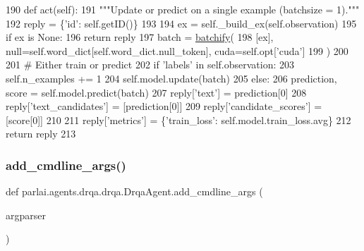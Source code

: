 \begin{DoxyCode}
190     \textcolor{keyword}{def }act(self):
191         \textcolor{stringliteral}{"""Update or predict on a single example (batchsize = 1)."""}
192         reply = \{\textcolor{stringliteral}{'id'}: self.getID()\}
193 
194         ex = self.\_build\_ex(self.observation)
195         \textcolor{keywordflow}{if} ex \textcolor{keywordflow}{is} \textcolor{keywordtype}{None}:
196             \textcolor{keywordflow}{return} reply
197         batch = \hyperlink{namespaceparlai_1_1agents_1_1drqa_1_1utils_aca22dd97c5b6dcda2a7479c1cb22ef1e}{batchify}(
198             [ex], null=self.word\_dict[self.word\_dict.null\_token], cuda=self.opt[\textcolor{stringliteral}{'cuda'}]
199         )
200 
201         \textcolor{comment}{# Either train or predict}
202         \textcolor{keywordflow}{if} \textcolor{stringliteral}{'labels'} \textcolor{keywordflow}{in} self.observation:
203             self.n\_examples += 1
204             self.model.update(batch)
205         \textcolor{keywordflow}{else}:
206             prediction, score = self.model.predict(batch)
207             reply[\textcolor{stringliteral}{'text'}] = prediction[0]
208             reply[\textcolor{stringliteral}{'text\_candidates'}] = [prediction[0]]
209             reply[\textcolor{stringliteral}{'candidate\_scores'}] = [score[0]]
210 
211         reply[\textcolor{stringliteral}{'metrics'}] = \{\textcolor{stringliteral}{'train\_loss'}: self.model.train\_loss.avg\}
212         \textcolor{keywordflow}{return} reply
213 
\end{DoxyCode}
\mbox{\label{classparlai_1_1agents_1_1drqa_1_1drqa_1_1DrqaAgent_a3469159780c52ff1a4d4309dddf250ff}} 
\subsubsection{\texorpdfstring{add\+\_\+cmdline\+\_\+args()}{add\_cmdline\_args()}}
{\footnotesize\ttfamily def parlai.\+agents.\+drqa.\+drqa.\+Drqa\+Agent.\+add\+\_\+cmdline\+\_\+args (\begin{DoxyParamCaption}\item[{}]{argparser }\end{DoxyParamCaption})\hspace{0.3cm}{\ttfamily [static]}}



